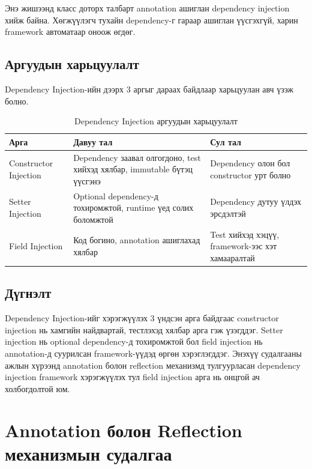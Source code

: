 Энэ жишээнд  класс доторх
 талбарт 
annotation ашиглан dependency injection хийж байна. Хөгжүүлэгч тухайн
dependency-г гараар  ашиглан үүсгэхгүй, харин framework
автоматаар оноож өгдөг.

\subsection{Аргуудын харьцуулалт}

Dependency Injection-ийн дээрх 3 аргыг дараах байдлаар харьцуулан авч үзэж болно.

\begin{table}[H]
\centering
\small
\renewcommand{\arraystretch}{1.2}
\caption{Dependency Injection аргуудын харьцуулалт}
\label{tab:di-comparison}
\begin{tabularx}{\textwidth}{|L{0.22\textwidth}|Y|Y|}
\hline
\textbf{Арга} & \textbf{Давуу тал} & \textbf{Сул тал} \\
\hline
Constructor Injection & Dependency заавал олгогдоно, test хийхэд хялбар, immutable бүтэц үүсгэнэ & Dependency олон бол constructor урт болно \\
\hline
Setter Injection & Optional dependency-д тохиромжтой, runtime үед солих боломжтой & Dependency дутуу үлдэх эрсдэлтэй \\
\hline
Field Injection & Код богино, annotation ашиглахад хялбар & Test хийхэд хэцүү, framework-ээс хэт хамааралтай \\
\hline
\end{tabularx}
\normalsize
\renewcommand{\arraystretch}{1}
\end{table}

\newpage
\subsection{Дүгнэлт}

Dependency Injection-ийг хэрэгжүүлэх 3 үндсэн арга байдгаас constructor injection нь хамгийн найдвартай, тестлэхэд хялбар арга гэж үзэгддэг. Setter injection нь optional dependency-д тохиромжтой бол field injection нь annotation-д суурилсан framework-үүдэд өргөн хэрэглэгддэг. Энэхүү судалгааны ажлын хүрээнд annotation болон reflection механизмд тулгуурласан dependency injection framework хэрэгжүүлэх тул field injection арга нь онцгой ач холбогдолтой юм.
\newpage
\section{Annotation болон Reflection механизмын судалгаа}

